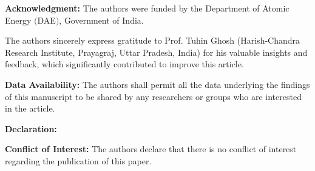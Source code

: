 \documentclass[12pt]{amsart}
\numberwithin{equation}{section}
\theoremstyle{definition}
\theoremstyle{remark}
\numberwithin{equation}{section}
\begin{document}
	
	\vspace{.3cm}
	\textbf{Acknowledgment:} The authors were funded by the Department of Atomic Energy $($DAE$)$, Government of India. 
	
	The authors sincerely express gratitude to Prof. Tuhin Ghosh (Harish-Chandra Research Institute, Prayagraj, Uttar Pradesh, India) for his valuable insights and feedback, which significantly contributed to improve this article.
	
	
	
	
	
	
	\vspace{.3cm}
	\textbf{Data Availability:} The authors shall permit all the data underlying the findings of this manuscript to be shared by any researchers or groups who are interested in the article.
	
	
	\vspace{.3cm}
	\textbf{Declaration:}
	
	
	\vspace{.3cm}
	\textbf{Conflict of Interest:} The authors declare that there is no conflict of interest regarding the publication of this paper.
	
	
	
	
	{\small 
		
		}
	
	
\end{document}
